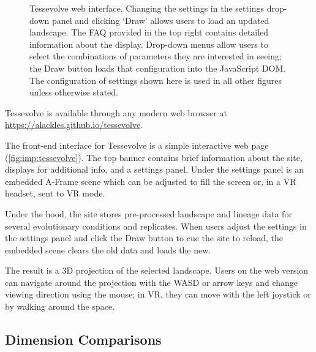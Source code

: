 \begin{figure}
    \centering
    \caption{Tessevolve web interface. Changing the settings in the settings drop-down panel and clicking `Draw' allows users to load an updated landscape. The FAQ provided in the top right contains detailed information about the display. Drop-down menus allow users to select the combinations of parameters they are interested in seeing; the Draw button loads that configuration into the JavaScript DOM. The configuration of settings shown here is used in all other figures unless otherwise stated.}
    \label{fig:imp:tessevolve}
\end{figure}


Tessevolve is available through any modern web browser at \url{https://alackles.github.io/tessevolve}.

The front-end interface for Tessevolve is a simple interactive web page (\autoref{fig:imp:tessevolve}). The top banner contains brief information about the site, displays for additional info, and a settings panel. Under the settings panel is an embedded A-Frame scene which can be adjusted to fill the screen or, in a VR headset, sent to VR mode. 

Under the hood, the site stores pre-processed landscape and lineage data for several evolutionary conditions and replicates. When users adjust the settings in the settings panel and click the Draw button to cue the site to reload, the embedded scene clears the old data and loads the new. 

The result is a 3D projection of the selected landscape. Users on the web version can navigate around the projection with the WASD or arrow keys and change viewing direction using the mouse; in VR, they can move with the left joystick or by walking around the space. 

\subsection{Dimension Comparisons}

